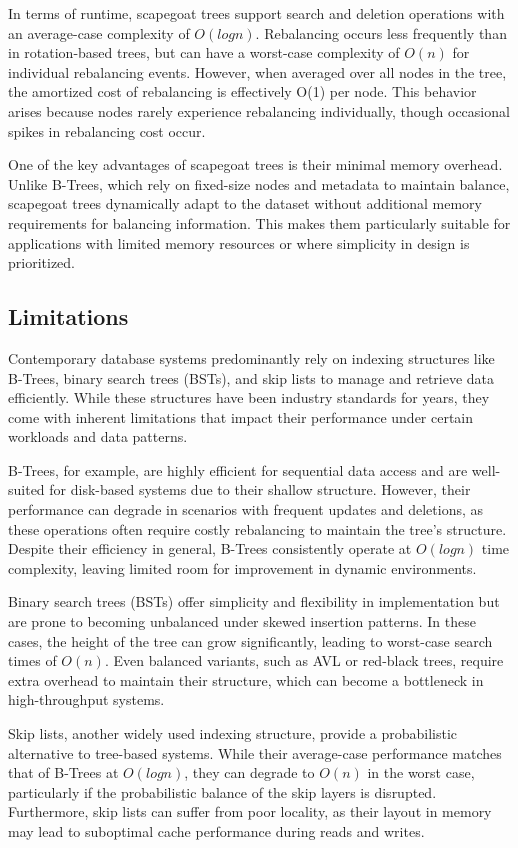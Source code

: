 \documentclass[sigconf]{acmart}
\begin{document}
In terms of runtime, scapegoat trees support search and deletion operations with an average-case complexity of $O(logn)$. Rebalancing occurs less frequently than in rotation-based trees, but can have a worst-case complexity of $O(n)$ for individual rebalancing events. However, when averaged over all nodes in the tree, the amortized cost of rebalancing is effectively O(1) per node. This behavior arises because nodes rarely experience rebalancing individually, though occasional spikes in rebalancing cost occur.

One of the key advantages of scapegoat trees is their minimal memory overhead. Unlike B-Trees, which rely on fixed-size nodes and metadata to maintain balance, scapegoat trees dynamically adapt to the dataset without additional memory requirements for balancing information. This makes them particularly suitable for applications with limited memory resources or where simplicity in design is prioritized. 

\subsection{Limitations}
Contemporary database systems predominantly rely on indexing structures like B-Trees, binary search trees (BSTs), and skip lists to manage and retrieve data efficiently. While these structures have been industry standards for years, they come with inherent limitations that impact their performance under certain workloads and data patterns.

B-Trees, for example, are highly efficient for sequential data access and are well-suited for disk-based systems due to their shallow structure. However, their performance can degrade in scenarios with frequent updates and deletions, as these operations often require costly rebalancing to maintain the tree's structure. Despite their efficiency in general, B-Trees consistently operate at $O(logn)$ time complexity, leaving limited room for improvement in dynamic environments.

Binary search trees (BSTs) offer simplicity and flexibility in implementation but are prone to becoming unbalanced under skewed insertion patterns. In these cases, the height of the tree can grow significantly, leading to worst-case search times of $O(n)$. Even balanced variants, such as AVL or red-black trees, require extra overhead to maintain their structure, which can become a bottleneck in high-throughput systems.

Skip lists, another widely used indexing structure, provide a probabilistic alternative to tree-based systems. While their average-case performance matches that of B-Trees at $O(logn)$, they can degrade to $O(n)$ in the worst case, particularly if the probabilistic balance of the skip layers is disrupted. Furthermore, skip lists can suffer from poor locality, as their layout in memory may lead to suboptimal cache performance during reads and writes.
\end{document}
